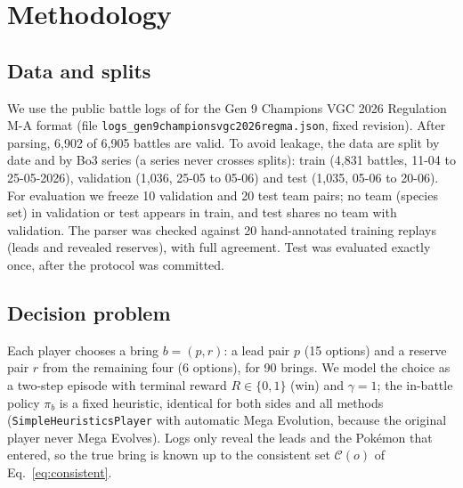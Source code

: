 %

\section{Methodology}

\subsection{Data and splits}
We use the public battle logs of \cite{angliss2026} for the Gen 9 Champions VGC 2026 Regulation M-A format
(file \texttt{logs\_gen9championsvgc2026regma.json}, fixed revision). After parsing, 6{,}902 of 6{,}905 battles are valid.
To avoid leakage, the data are split by date and by Bo3 series (a series never crosses splits):
train (4{,}831 battles, 11-04 to 25-05-2026), validation (1{,}036, 25-05 to 05-06) and test (1{,}035, 05-06 to 20-06).
For evaluation we freeze 10 validation and 20 test team pairs; no team (species set) in validation or test appears in train,
and test shares no team with validation. The parser was checked against 20 hand-annotated training replays
(leads and revealed reserves), with full agreement. Test was evaluated exactly once, after the protocol was committed.

\subsection{Decision problem}
Each player chooses a bring $b=(p,r)$: a lead pair $p$ (15 options) and a reserve pair $r$ from the remaining four (6 options),
for 90 brings. We model the choice as a two-step episode with terminal reward $R\in\{0,1\}$ (win) and $\gamma=1$;
the in-battle policy $\pi_b$ is a fixed heuristic, identical for both sides and all methods
(\texttt{SimpleHeuristicsPlayer} with automatic Mega Evolution, because the original player never Mega Evolves).
Logs only reveal the leads and the Pokémon that entered, so the true bring is known up to the consistent set
$\mathcal C(o)$ of Eq.~\eqref{eq:consistent}.

